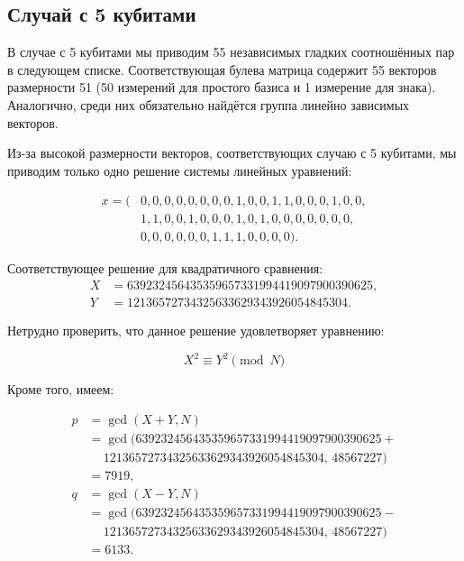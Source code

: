 \subsection*{Случай с 5 кубитами}

В случае с 5 кубитами мы приводим 55 независимых гладких соотношённых пар в
следующем списке. Соответствующая булева матрица содержит 55 векторов
размерности 51 (50 измерений для простого базиса и 1 измерение для знака).
Аналогично, среди них обязательно найдётся группа линейно зависимых векторов.

Из-за высокой размерности векторов, соответствующих случаю с 5 кубитами, мы
приводим только одно решение системы линейных уравнений:

\begin{equation}
\begin{aligned}
x = (&0, 0, 0, 0, 0, 0, 0, 0, 1, 0, 0, 1, 1, 0, 0, 0, 1, 0, 0, \\
&1, 1, 0, 0, 1, 0, 0, 0, 1, 0, 1, 0, 0, 0, 0, 0, 0, 0, \\
&0, 0, 0, 0, 0, 0, 1, 1, 1, 0, 0, 0, 0).
\end{aligned}
\end{equation}

Соответствующее решение для квадратичного сравнения:
\begin{equation}
\begin{aligned}
X &= 639232456435359657331994419097900390625, \\
Y &= 12136572734325633629343926054845304.
\end{aligned}
\end{equation}

Нетрудно проверить, что данное решение удовлетворяет уравнению:

\begin{equation}
X^2 \equiv Y^2 \pmod{N}
\end{equation}

Кроме того, имеем:

\begin{equation}
\begin{aligned}
p &= \gcd(X + Y, N) \\
  &= \gcd(639232456435359657331994419097900390625 + \\
  &\quad \ 12136572734325633629343926054845304, \,48567227) \\
  &= 7919, \\
q &= \gcd(X - Y, N) \\
  &= \gcd(639232456435359657331994419097900390625 - \\
  &\quad \ 12136572734325633629343926054845304, \,48567227) \\
  &= 6133.
\end{aligned}
\end{equation}

